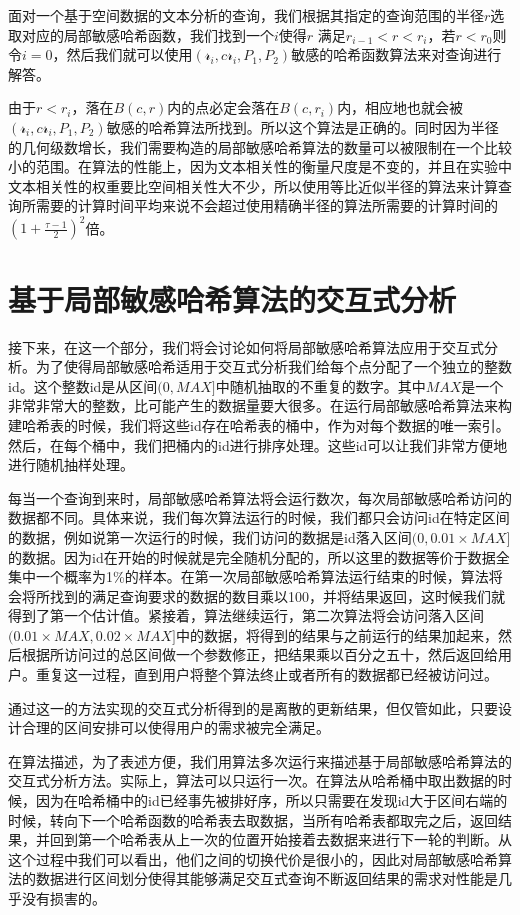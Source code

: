 面对一个基于空间数据的文本分析的查询，我们根据其指定的查询范围的半径$ r $选取对应的局部敏感哈希函数，我们找到一个$ i $使得$ r $ 满足$ r_{i-1} < r < r_{i} $，若$ r < r_0 $则令$ i = 0 $，然后我们就可以使用$ (\mathcal{r}_i,c\mathcal{r}_i,P_1,P_2) $敏感的哈希函数算法来对查询进行解答。

由于$ r < r_{i} $，落在$ B(c,r) $内的点必定会落在$ B(c,r_i) $内，相应地也就会被$ (\mathcal{r}_i,c\mathcal{r}_i,P_1,P_2) $敏感的哈希算法所找到。所以这个算法是正确的。同时因为半径的几何级数增长，我们需要构造的局部敏感哈希算法的数量可以被限制在一个比较小的范围。在算法的性能上，因为文本相关性的衡量尺度是不变的，并且在实验中文本相关性的权重要比空间相关性大不少，所以使用等比近似半径的算法来计算查询所需要的计算时间平均来说不会超过使用精确半径的算法所需要的计算时间的$ (1+\frac{\tau - 1}{2})^2 $倍。

\section{基于局部敏感哈希算法的交互式分析}
\label{lsh2}
	接下来，在这一个部分，我们将会讨论如何将局部敏感哈希算法应用于交互式分析。为了使得局部敏感哈希适用于交互式分析我们给每个点分配了一个独立的整数id。这个整数id是从区间$ (0, MAX] $中随机抽取的不重复的数字。其中$ MAX $是一个非常非常大的整数，比可能产生的数据量要大很多。在运行局部敏感哈希算法来构建哈希表的时候，我们将这些id存在哈希表的桶中，作为对每个数据的唯一索引。然后，在每个桶中，我们把桶内的id进行排序处理。这些id可以让我们非常方便地进行随机抽样处理。
	
	每当一个查询到来时，局部敏感哈希算法将会运行数次，每次局部敏感哈希访问的数据都不同。具体来说，我们每次算法运行的时候，我们都只会访问id在特定区间的数据，例如说第一次运行的时候，我们访问的数据是id落入区间$ (0, 0.01 \times MAX] $的数据。因为id在开始的时候就是完全随机分配的，所以这里的数据等价于数据全集中一个概率为1\%的样本。在第一次局部敏感哈希算法运行结束的时候，算法将会将所找到的满足查询要求的数据的数目乘以100，并将结果返回，这时候我们就得到了第一个估计值。紧接着，算法继续运行，第二次算法将会访问落入区间$ (0.01 \times MAX, 0.02 \times MAX] $中的数据，将得到的结果与之前运行的结果加起来，然后根据所访问过的总区间做一个参数修正，把结果乘以百分之五十，然后返回给用户。重复这一过程，直到用户将整个算法终止或者所有的数据都已经被访问过。
	
	通过这一的方法实现的交互式分析得到的是离散的更新结果，但仅管如此，只要设计合理的区间安排可以使得用户的需求被完全满足。
	
	在算法描述，为了表述方便，我们用算法多次运行来描述基于局部敏感哈希算法的交互式分析方法。实际上，算法可以只运行一次。在算法从哈希桶中取出数据的时候，因为在哈希桶中的id已经事先被排好序，所以只需要在发现id大于区间右端的时候，转向下一个哈希函数的哈希表去取数据，当所有哈希表都取完之后，返回结果，并回到第一个哈希表从上一次的位置开始接着去数据来进行下一轮的判断。从这个过程中我们可以看出，他们之间的切换代价是很小的，因此对局部敏感哈希算法的数据进行区间划分使得其能够满足交互式查询不断返回结果的需求对性能是几乎没有损害的。
	
